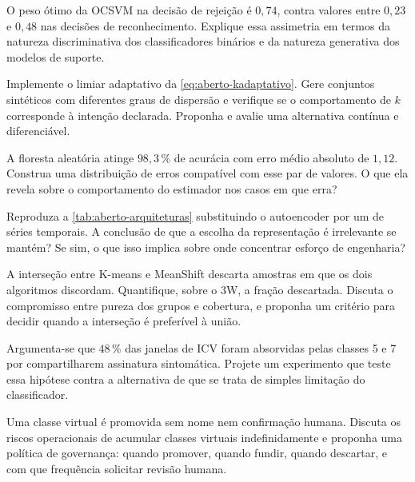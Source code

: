 \begin{exercicios}
\item O peso ótimo da OCSVM na decisão de rejeição é $0{,}74$, contra valores entre
      $0{,}23$ e $0{,}48$ nas decisões de reconhecimento. Explique essa assimetria em
      termos da natureza discriminativa dos classificadores binários e da natureza
      generativa dos modelos de suporte.

\item Implemente o limiar adaptativo da \cref{eq:aberto-kadaptativo}. Gere conjuntos
      sintéticos com diferentes graus de dispersão e verifique se o comportamento de $k$
      corresponde à intenção declarada. Proponha e avalie uma alternativa contínua e
      diferenciável.

\item A floresta aleatória atinge $98{,}3\,\%$ de acurácia com erro médio absoluto de
      $1{,}12$. Construa uma distribuição de erros compatível com esse par de valores.
      O que ela revela sobre o comportamento do estimador nos casos em que erra?

\item Reproduza a \cref{tab:aberto-arquiteturas} substituindo o autoencoder por um
       de séries temporais. A conclusão de que a escolha da
      representação é irrelevante se mantém? Se sim, o que isso implica sobre onde
      concentrar esforço de engenharia?

\item A interseção entre K-means e MeanShift descarta amostras em que os dois algoritmos
      discordam. Quantifique, sobre o 3W, a fração descartada. Discuta o compromisso
      entre pureza dos grupos e cobertura, e proponha um critério para decidir quando a
      interseção é preferível à união.

\item Argumenta-se que $48\,\%$ das janelas de ICV foram absorvidas pelas classes 5 e 7
      por compartilharem assinatura sintomática. Projete um experimento que teste essa
      hipótese contra a alternativa de que se trata de simples limitação do
      classificador.

\item Uma classe virtual é promovida sem nome nem confirmação humana. Discuta os riscos
      operacionais de acumular classes virtuais indefinidamente e proponha uma política
      de governança: quando promover, quando fundir, quando descartar, e com que
      frequência solicitar revisão humana.
\end{exercicios}

